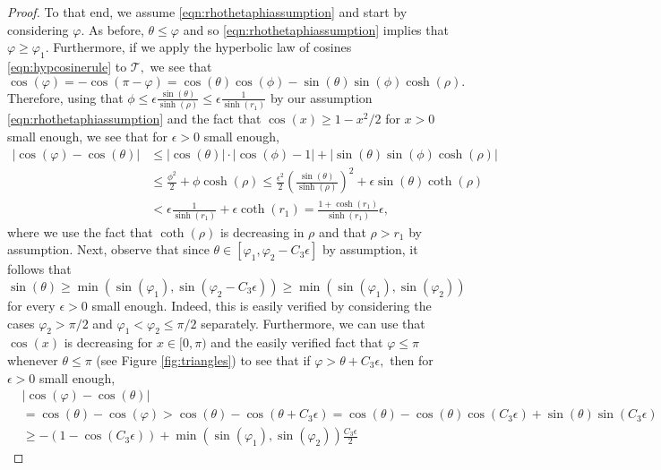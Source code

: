 \documentclass[10pt,a4paper]{amsart}
\newcommand{\CT}{{\mathcal{T}}}
\begin{document}
\begin{proof}
To that end, we assume \eqref{eqn:rhothetaphiassumption} and start by considering $\varphi.$ 
As before, $\theta\leq \varphi$ and so \eqref{eqn:rhothetaphiassumption} implies that 
$\varphi \geq \varphi_1.$ Furthermore, 
if we apply the hyperbolic law of cosines \eqref{eqn:hypcosinerule} to $\CT,$ we see that 
\[
\cos(\varphi) =-\cos(\pi-\varphi) 
=\cos(\theta)\cos(\phi)-\sin(\theta)\sin(\phi)\cosh(\rho).   
\]
Therefore, using that $\phi\leq \epsilon \frac{\sin(\theta)}{\sinh(\rho)}
\leq \epsilon \frac{1}{\sinh(r_1)}$ by our assumption 
\eqref{eqn:rhothetaphiassumption} and the fact that $\cos(x)\geq 1-x^2/2$ for $x>0$
small enough, we see that for $\epsilon>0$ small enough,
\begin{align} \label{eqn:cosvarphithetaineq1}
|\cos(\varphi)-\cos(\theta)|
& \leq |\cos(\theta)|\cdot |\cos(\phi)-1| +|\sin(\theta)\sin(\phi)\cosh(\rho)| \\
& \leq \frac{\phi^2}{2}+\phi\cosh(\rho)
\leq \frac{\epsilon^2}{2}\left(\frac{\sin(\theta)}{\sinh(\rho)}\right)^2
+\epsilon\sin(\theta)\coth(\rho)\\
& < \epsilon \frac{1}{\sinh(r_1)}+\epsilon\coth(r_1) 
= \frac{1+\cosh(r_1)}{\sinh(r_1)}\epsilon, \nonumber
\end{align}
where we use the fact that $\coth(\rho)$ is decreasing in $\rho$ and that 
$\rho>r_1$ by assumption.
Next, observe that since $\theta\in[\varphi_1,\varphi_2-C_3 \epsilon]$ by assumption, 
it follows that
\begin{equation} \label{eqn:minsin}
\sin(\theta) \geq \min(\sin(\varphi_1),\sin(\varphi_2-C_3 \epsilon))
\geq \min(\sin(\varphi_1),\sin(\varphi_2))    
\end{equation}
for every $\epsilon>0$ small enough. Indeed, this is easily verified by considering 
the cases $\varphi_2>\pi/2$ and $\varphi_1<\varphi_2\leq \pi/2$ separately.
Furthermore, we can use that $\cos(x)$ is decreasing for $x\in[0,\pi)$
and the easily verified fact that $\varphi\leq \pi$ whenever $\theta\leq \pi$ (see Figure 
\ref{fig:triangles}) to see that
if $\varphi>\theta+C_3\epsilon,$ then for $\epsilon>0$ small enough,
\begin{align} \label{eqn:cosvarphithetaineq1contradict}
&|\cos(\varphi)-\cos(\theta)| \\
&=\cos(\theta)-\cos(\varphi)
>\cos(\theta)-\cos(\theta+C_3\epsilon) 
=\cos(\theta)-\cos(\theta)\cos(C_3\epsilon)+\sin(\theta)\sin(C_3\epsilon) \nonumber \\
& \geq -(1-\cos(C_3\epsilon))+\min(\sin(\varphi_1),\sin(\varphi_2))\frac{C_3\epsilon}{2} 

\end{align}
\end{proof}
\end{document}
